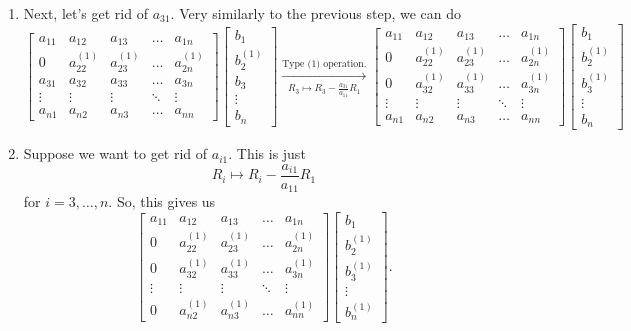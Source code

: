 \documentclass[letterpaper]{article}
\newcommand{\0}{\mathbf{0}}
\begin{document}
\begin{enumerate}
    \item Next, let's get rid of $a_{31}$. Very similarly to the previous step, we can do
    \[\begin{bmatrix}
        a_{11} & a_{12} & a_{13} & \hdots & a_{1n} \\ 
        0      & a_{22}^{(1)} & a_{23}^{(1)} & \hdots & a_{2n}^{(1)} \\ 
        a_{31} & a_{32} & a_{33} & \hdots & a_{3n} \\ 
        \vdots & \vdots & \vdots & \ddots & \vdots \\ 
        a_{n1} & a_{n2} & a_{n3} & \hdots & a_{nn}
    \end{bmatrix} \begin{bmatrix}
        b_1 \\ b_2^{(1)} \\ b_3 \\ \vdots \\ b_n
    \end{bmatrix} \xrightarrow[R_3 \mapsto R_3 - \frac{a_{31}}{a_{11}}R_1]{\text{Type (1) operation.}} \begin{bmatrix}
        a_{11} & a_{12} & a_{13} & \hdots & a_{1n} \\ 
        0      & a_{22}^{(1)} & a_{23}^{(1)} & \hdots & a_{2n}^{(1)} \\ 
        0      & a_{32}^{(1)} & a_{33}^{(1)} & \hdots & a_{3n}^{(1)} \\ 
        \vdots & \vdots & \vdots & \ddots & \vdots \\ 
        a_{n1} & a_{n2} & a_{n3} & \hdots & a_{nn}
    \end{bmatrix} \begin{bmatrix}
        b_1 \\ b_2^{(1)} \\ b_3^{(1)} \\ \vdots \\ b_n
    \end{bmatrix}\]

    \item Suppose we want to get rid of $a_{i1}$. This is just 
    \[R_i \mapsto R_i - \frac{a_{i1}}{a_{11}}R_1\]
    for $i = 3, \hdots, n$. So, this gives us 
    \[\begin{bmatrix}
        a_{11} & a_{12} & a_{13} & \hdots & a_{1n} \\ 
        0      & a_{22}^{(1)} & a_{23}^{(1)} & \hdots & a_{2n}^{(1)} \\ 
        0      & a_{32}^{(1)} & a_{33}^{(1)} & \hdots & a_{3n}^{(1)} \\ 
        \vdots & \vdots & \vdots & \ddots & \vdots \\ 
        0      & a_{n2}^{(1)} & a_{n3}^{(1)} & \hdots & a_{nn}^{(1)}
    \end{bmatrix} \begin{bmatrix}
        b_1 \\ b_2^{(1)} \\ b_3^{(1)} \\ \vdots \\ b_n^{(1)}
    \end{bmatrix}.\]
\end{enumerate}
\end{document}
